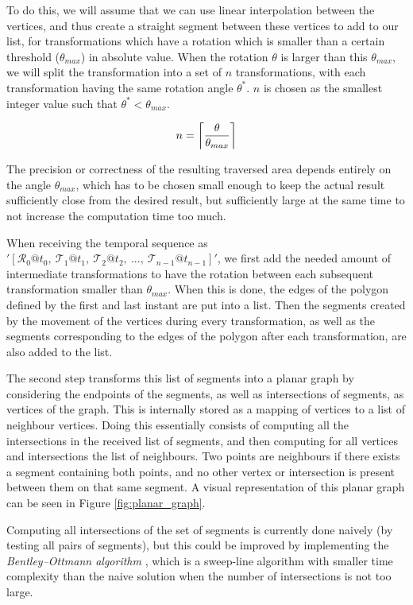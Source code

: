 To do this, we will assume that we can use linear interpolation between the vertices, and thus create a straight segment between these vertices to add to our list, for transformations which have a rotation which is smaller than a certain threshold ($\theta_{max}$) in absolute value. When the rotation $\theta$ is larger than this $\theta_{max}$, we will split the transformation into a set of $n$ transformations, with each transformation having the same rotation angle $\theta^*$. $n$ is chosen as the smallest integer value such that $\theta^* < \theta_{max}$.

\[
    n = \ceil*{\frac{\theta}{\theta_{max}}}
\]

The precision or correctness of the resulting traversed area depends entirely on the angle $\theta_{max}$, which has to be chosen small enough to keep the actual result sufficiently close from the desired result, but sufficiently large at the same time to not increase the computation time too much.

When receiving the temporal sequence as $'[\mathcal{R}_0@t_0,\ \mathcal{T}_1@t_1,\ \mathcal{T}_2@t_2,\ ...,\ \mathcal{T}_{n-1}@t_{n-1}]'$, we first add the needed amount of intermediate transformations to have the rotation between each subsequent transformation smaller than $\theta_{max}$. When this is done, the edges of the polygon defined by the first and last instant are put into a list. Then the segments created by the movement of the vertices during every transformation, as well as the segments corresponding to the edges of the polygon after each transformation, are also added to the list.

The second step transforms this list of segments into a planar graph by considering the endpoints of the segments, as well as intersections of segments, as vertices of the graph. This is internally stored as a mapping of vertices to a list of neighbour vertices. Doing this essentially consists of computing all the intersections in the received list of segments, and then computing for all vertices and intersections the list of neighbours. Two points are neighbours if there exists a segment containing both points, and no other vertex or intersection is present between them on that same segment. A visual representation of this planar graph can be seen in Figure \ref{fig:planar_graph}.

Computing all intersections of the set of segments is currently done naively (by testing all pairs of segments), but this could be improved by implementing the \textit{Bentley–Ottmann algorithm} \cite{computational_geometry}, which is a sweep-line algorithm with smaller time complexity than the naive solution when the number of intersections is not too large.

